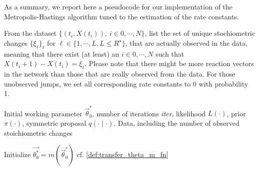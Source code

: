 \documentclass[pdflatex,sn-mathphys-num]{sn-jnl}%
\theoremstyle{thmstyleone}%
\theoremstyle{thmstyletwo}%
\theoremstyle{thmstylethree}%
\begin{document}
As a summary, we report here a pseudocode for our implementation of the Metropolis-Hastings algorithm tuned to the estimation of the rate constants. 




\begin{algorithm}[H]
\caption{Metropolis-Hastings MCMC with working parameters $\overrightarrow{\theta^*}$}
\label{alg:mcmc_theta_star_explicit}
\begin{algorithmic}[1]
From the dataset $\{(t_i, X(t_i)),~ i\in{0,\cdots,N}\}$, list the set of unique stochiometric changes $\{\xi_{\ell}\}_\ell$ for $\ell \in\{1,\cdots,L,L\leq R^\star\}$, that are actually observed in the data, meaning that there exist (at least) an $i\in{0,\cdots,N}$ such that $X(t_i +1)-X(t_i)=\xi_{\ell}$. Please note that there might be more reaction vectors in the network than those that are really observed from the data. For those unobserved jumps, we set all corresponding rate constants to $0$ with probability 1.

\State {} 







Initial working parameter $\overrightarrow{\theta}^*_0$, number of iterations \textit{iter}, likelihood $L(\cdot)$, prior $\pi(\cdot)$, symmetric proposal $q(\cdot \mid \cdot)$. Data, including the number of observed stoichiometric changes 





\State Initialize $\overrightarrow{\theta_{0}^*} = m\left(\overrightarrow{\theta}_{0}^*\right)$ cf. \eqref{def:transfer_theta_m_fn}


\end{algorithmic}
\end{algorithm}
\end{document}
